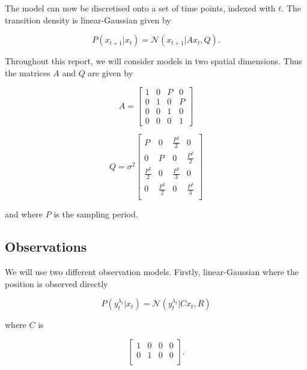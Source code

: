 The model can now be discretised onto a set of time points, indexed with $t$. The transition density is linear-Gaussian given by

\begin{equation}
P(x_{t+1}|x_{t}) = \mathcal{N}(x_{t+1}|A x_{t},Q).
\end{equation}

Throughout this report, we will consider models in two spatial dimensions. Thus the matrices $A$ and $Q$ are given by

\begin{equation}
A = \begin{bmatrix}
1 & 0 & P & 0 \\
0 & 1 & 0 & P \\
0 & 0 & 1 & 0 \\
0 & 0 & 0 & 1
\end{bmatrix}
\end{equation}

\begin{equation}
Q = \sigma^2 \begin{bmatrix}
P & 0 & \frac{P^2}{2} & 0 \\
0 & P & 0 & \frac{P^2}{2} \\
\frac{P^2}{2} & 0 & \frac{P^3}{3} & 0 \\
0 & \frac{P^2}{2} & 0 & \frac{P^3}{3} \\
\end{bmatrix}
\end{equation}

and where $P$ is the sampling period.



\subsection{Observations}
We will use two different observation models. Firstly, linear-Gaussian where the position is observed directly

\begin{equation}
P(y_t^{\lambda_t}|x_t) = \mathcal{N}(y_t^{\lambda_t}|C x_t, R)
\end{equation}

where $C$ is

\begin{equation}
\begin{bmatrix}
1 & 0 & 0 & 0 \\
0 & 1 & 0 & 0 \\
\end{bmatrix}.
\end{equation}

